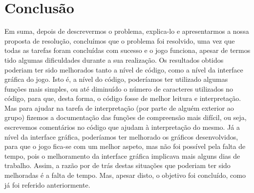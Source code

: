 \documentclass[a4paper]{report}
\begin{document}
\chapter{Conclusão}
\label{sec:conclusao}
Em suma, depois de descrevermos o problema, explica-lo e apresentarmos a nossa proposta de resolução, concluímos que o problema foi resolvido, uma vez que todas as tarefas foram concluídas com sucesso e o jogo funciona, apesar de termos tido algumas dificuldades durante a sua realização. Os resultados obtidos poderiam ter sido melhorados tanto a nível de código, como a nível da interface gráfica do jogo. Isto é, a nível do código, poderíamos ter utilizado algumas funções mais simples, ou até diminuído o número de caracteres utilizados no código, para que, desta forma, o código fosse de melhor leitura e interpretação. Mas para ajudar na tarefa de interpretação (por parte de alguém exterior ao grupo) fizemos a documentação das funções de compreensão mais difícil, ou seja, escrevemos comentários no código que ajudam à interpretação do mesmo. Já a nível da interface gráfica, poderíamos ter melhorado os gráficos desenvolvidos, para que o jogo fica-se com um melhor aspeto, mas não foi possível pela falta de tempo, pois o melhoramento da interface gráfica implicava mais alguns dias de trabalho. Assim, a razão por de trás destas situações que poderiam ter sido melhoradas é a falta de tempo. Mas, apesar disto, o objetivo foi concluído, como já foi referido anteriormente.
\end{document}
